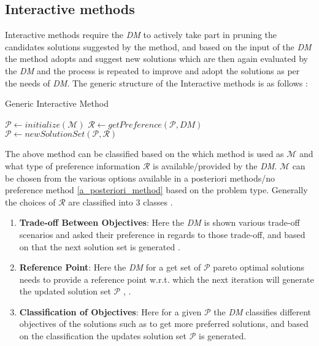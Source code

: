 \subsection{Interactive methods}
Interactive methods require the \textit{DM} to actively take part in pruning the candidates solutions suggested by the method, and based on the input of the \textit{DM} the method adopts and suggest new solutions which are then again evaluated by the \textit{DM} and the process is repeated to improve and adopt the solutions as per the needs of \textit{DM}.
\newline\newline The generic structure of the Interactive methods is as follows \cite{miettinen2008introduction}:
\begin{algorithm}
\caption{Generic Interactive Method}\label{algo_generic_interactive_method}
\begin{algorithmic}
\State $\mathcal{P} \gets initialize(\mathcal{M})$ 
\Do
    \State $\mathcal{R} \gets getPreference(\mathcal{P},DM)$
    \State $\mathcal{P} \gets newSolutionSet(\mathcal{P},\mathcal{R})$
\end{algorithmic}
\end{algorithm}
The above method can be classified based on the which method is used as $\mathcal{M}$ and what type of preference information $\mathcal{R}$ is available/provided by the \textit{DM}.
\newline \newline $\mathcal{M}$ can be chosen from the various options available in a posteriori methods/no preference method \ref{a_posteriori_method} based on the problem type.
\newline \newline Generally the choices of $\mathcal{R}$ are classified into 3 classes \cite{miettinen2008introduction}.
\begin{enumerate}
    \item \textbf{Trade-off Between Objectives}: Here the \textit{DM} is shown various trade-off scenarios and asked their preference in regards to those trade-off, and based on that the next solution set is generated \cite{zionts1976interactive}.
    \item \textbf{Reference Point}: Here the \textit{DM} for a get set of $\mathcal{P}$ pareto optimal solutions needs to provide a reference point w.r.t. which the next iteration will generate the updated solution set  $\mathcal{P}$ \cite{wierzbicki1986completeness}, \cite{wierzbicki2000modern}.
    \item \textbf{Classification of Objectives}: Here for a given $\mathcal{P}$ the \textit{DM} classifies different objectives of the solutions such as to get more preferred solutions, and based on the classification the updates solution set $\mathcal{P}$ is generated.
\end{enumerate}
\newpage

